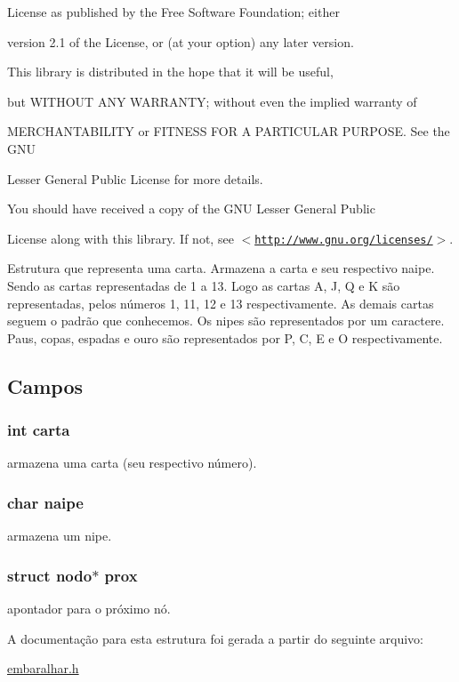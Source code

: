 License as published by the Free Software Foundation; either

version 2.1 of the License, or (at your option) any later version.

This library is distributed in the hope that it will be useful,

but WITHOUT ANY WARRANTY; without even the implied warranty of

MERCHANTABILITY or FITNESS FOR A PARTICULAR PURPOSE. See the GNU

Lesser General Public License for more details.

You should have received a copy of the GNU Lesser General Public

License along with this library. If not, see $<$\href{http://www.gnu.org/licenses/}{\tt http://www.gnu.org/licenses/}$>$.

Estrutura que representa uma carta. Armazena a carta e seu respectivo naipe. Sendo as cartas representadas de 1 a 13. Logo as cartas A, J, Q e K são representadas, pelos números 1, 11, 12 e 13 respectivamente. As demais cartas seguem o padrão que conhecemos. Os nipes são representados por um caractere. Paus, copas, espadas e ouro são representados por P, C, E e O respectivamente. 

\subsection{Campos}
\hypertarget{structnodo_a0d153279003388933e082f40da4a3702}{
\subsubsection[{carta}]{\setlength{\rightskip}{0pt plus 5cm}int {\bf carta}}}
\label{structnodo_a0d153279003388933e082f40da4a3702}


armazena uma carta (seu respectivo número). 

\hypertarget{structnodo_aba763958bee1abb2961d0d2e82f8cdfb}{
\subsubsection[{naipe}]{\setlength{\rightskip}{0pt plus 5cm}char {\bf naipe}}}
\label{structnodo_aba763958bee1abb2961d0d2e82f8cdfb}


armazena um nipe. 

\hypertarget{structnodo_a486ad5c9b955ff42eaf8fbf3330e4c75}{
\subsubsection[{prox}]{\setlength{\rightskip}{0pt plus 5cm}struct {\bf nodo}$\ast$ {\bf prox}}}
\label{structnodo_a486ad5c9b955ff42eaf8fbf3330e4c75}


apontador para o próximo nó. 



A documentação para esta estrutura foi gerada a partir do seguinte arquivo:\begin{DoxyCompactItemize}
\item 
\hyperlink{embaralhar_8h}{embaralhar.h}\end{DoxyCompactItemize}

